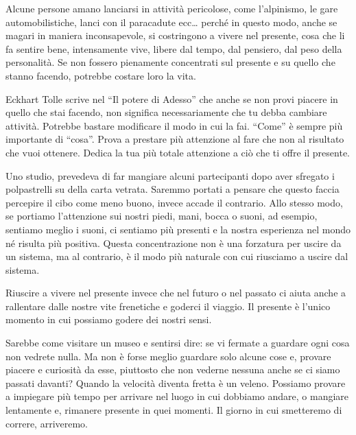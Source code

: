 \documentclass[12pt]{book} %
\begin{document}
Alcune persone amano lanciarsi in attività pericolose, come l'alpinismo, le gare automobilistiche,
lanci con il paracadute ecc… perché in questo modo, anche se magari in maniera inconsapevole, si costringono a vivere
nel presente, cosa che li fa sentire bene, intensamente vive, libere dal tempo, dal pensiero, dal peso della
personalità. Se non fossero pienamente concentrati sul presente e su quello che stanno facendo, potrebbe costare loro
la vita.

Eckhart Tolle scrive nel “Il potere di Adesso” che anche se non provi piacere in quello che stai facendo, non significa
necessariamente che tu debba cambiare attività. Potrebbe bastare modificare il modo in cui la fai. “Come” è sempre più
importante di “cosa”. Prova a prestare più attenzione al fare che non al risultato che vuoi ottenere. Dedica la tua più
totale attenzione a ciò che ti offre il presente.


\bigskip

Uno studio, prevedeva di far mangiare alcuni partecipanti dopo aver sfregato i polpastrelli su della carta vetrata.
Saremmo portati a pensare che questo faccia percepire il cibo come meno buono, invece accade il contrario. Allo stesso
modo, se portiamo l'attenzione sui nostri piedi, mani, bocca o suoni, ad esempio, sentiamo meglio i suoni, ci sentiamo
più presenti e la nostra esperienza nel mondo né risulta più positiva. Questa concentrazione non è una forzatura per
uscire da un sistema, ma al contrario, è il modo più naturale con cui riusciamo a uscire dal sistema.

Riuscire a vivere nel presente invece che nel futuro o nel passato ci aiuta anche a rallentare dalle nostre vite
frenetiche e goderci il viaggio. Il presente è l'unico momento in cui possiamo godere dei nostri
sensi. 

Sarebbe come visitare un museo e sentirsi dire: se vi fermate a guardare ogni cosa non vedrete nulla. Ma non è forse
meglio guardare solo alcune cose e, provare piacere e curiosità da esse, piuttosto che non vederne nessuna anche se ci
siamo passati davanti? Quando la velocità diventa fretta è un veleno. Possiamo provare a impiegare più tempo per
arrivare nel luogo in cui dobbiamo andare, o mangiare lentamente e, rimanere presente in quei momenti. Il giorno in cui
smetteremo di correre, arriveremo.
\end{document}
